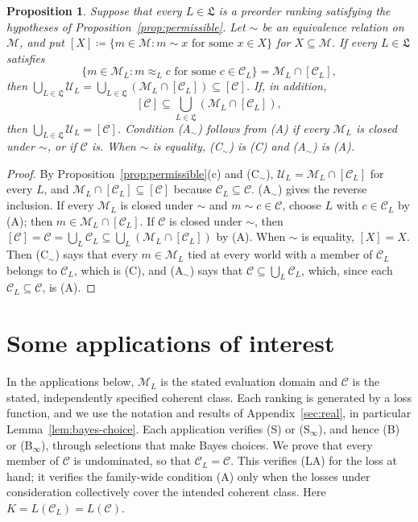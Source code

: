 \documentclass[11pt]{article}
\newtheorem{proposition}[theorem]{Proposition}
\theoremstyle{definition}
\theoremstyle{remark}
\newcommand{\M}{\mathcal M}
\newcommand{\C}{\mathcal C}
\newcommand{\U}{\mathcal U}
\begin{document}
\begin{proposition}\label{prop:permissible-equivalence}
Suppose that every $L\in\mathfrak L$ is a preorder ranking satisfying the hypotheses of Proposition~\ref{prop:permissible}. Let $\sim$ be an equivalence relation on $\M$, and put $[X]\coloneqq \{m\in\M:m\sim x\text{ for some }x\in X\}$ for $X\subseteq\M$. If every $L\in\mathfrak L$ satisfies
\begin{equation}\tag{C$_\sim$}\label{eq:identification-equivalence}
 \{m\in\M_L:m\approx_L c\text{ for some }c\in\C_L\}
 =\M_L\cap[\C_L],
\end{equation}
then $\bigcup_{L\in\mathfrak L}\U_L=\bigcup_{L\in\mathfrak L}(\M_L\cap[\C_L])\subseteq[\C]$. If, in addition,
\begin{equation}\tag{A$_\sim$}\label{eq:equivalence-coverage}
 [\C]\subseteq\bigcup_{L\in\mathfrak L}(\M_L\cap[\C_L]),
\end{equation}
then $\bigcup_{L\in\mathfrak L}\U_L=[\C]$. Condition (A$_\sim$) follows from (A) if every $\M_L$ is closed under $\sim$, or if $\C$ is. When $\sim$ is equality, (C$_\sim$) is (C) and (A$_\sim$) is (A).
\end{proposition}
\begin{proof}
By Proposition~\ref{prop:permissible}(c) and (C$_\sim$), $\U_L=\M_L\cap[\C_L]$ for every $L$, and $\M_L\cap[\C_L]\subseteq[\C]$ because $\C_L\subseteq\C$. (A$_\sim$) gives the reverse inclusion. If every $\M_L$ is closed under $\sim$ and $m\sim c\in\C$, choose $L$ with $c\in\C_L$ by (A); then $m\in\M_L\cap[\C_L]$. If $\C$ is closed under $\sim$, then $[\C]=\C=\bigcup_L\C_L\subseteq\bigcup_L(\M_L\cap[\C_L])$ by (A). When $\sim$ is equality, $[X]=X$. Then (C$_\sim$) says that every $m\in\M_L$ tied at every world with a member of $\C_L$ belongs to $\C_L$, which is (C), and (A$_\sim$) says that $\C\subseteq\bigcup_L\C_L$, which, since each $\C_L\subseteq\C$, is (A).
\end{proof}


\section{Some applications of interest}\label{sec:apps}
In the applications below, $\M_L$ is the stated evaluation domain and $\C$ is the stated, independently specified coherent class. Each ranking is generated by a loss function, and we use the notation and results of Appendix~\ref{sec:real}, in particular Lemma~\ref{lem:bayes-choice}. Each application verifies (S) or (S$_\infty$), and hence (B) or (B$_\infty$), through selections that make Bayes choices. We prove that every member of $\C$ is undominated, so that $\C_L=\C$. This verifies (LA) for the loss at hand; it verifies the family-wide condition (A) only when the losses under consideration collectively cover the intended coherent class. Here $K=L(\C_L)=L(\C)$.
\end{document}
